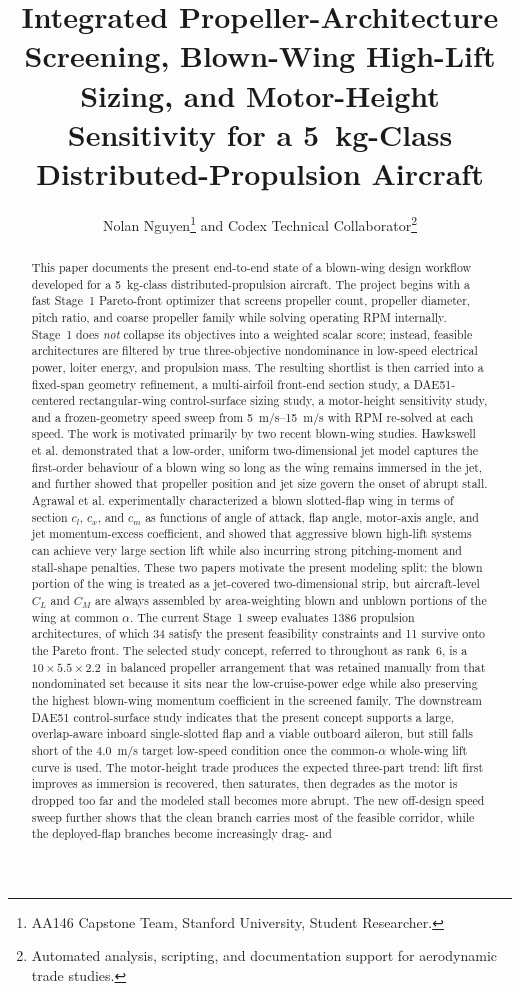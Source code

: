 \documentclass[conf]{new-aiaa}
\title{Integrated Propeller-Architecture Screening, Blown-Wing High-Lift Sizing, and Motor-Height Sensitivity for a \SI{5}{kg}-Class Distributed-Propulsion Aircraft}
\author{Nolan Nguyen\footnote{AA146 Capstone Team, Stanford University, Student Researcher.} and Codex Technical Collaborator\footnote{Automated analysis, scripting, and documentation support for aerodynamic trade studies.}}
\affil{AA146 Capstone, Stanford University, Stanford, California, 94305}
\begin{document}
\maketitle

\begin{abstract}
This paper documents the present end-to-end state of a blown-wing design workflow developed for a \SI{5}{kg}-class distributed-propulsion aircraft. The project begins with a fast Stage~1 Pareto-front optimizer that screens propeller count, propeller diameter, pitch ratio, and coarse propeller family while solving operating RPM internally. Stage~1 does \emph{not} collapse its objectives into a weighted scalar score; instead, feasible architectures are filtered by true three-objective nondominance in low-speed electrical power, loiter energy, and propulsion mass. The resulting shortlist is then carried into a fixed-span geometry refinement, a multi-airfoil front-end section study, a DAE51-centered rectangular-wing control-surface sizing study, a motor-height sensitivity study, and a frozen-geometry speed sweep from \SIrange{5}{15}{m/s} with RPM re-solved at each speed. The work is motivated primarily by two recent blown-wing studies. Hawkswell et al. demonstrated that a low-order, uniform two-dimensional jet model captures the first-order behaviour of a blown wing so long as the wing remains immersed in the jet, and further showed that propeller position and jet size govern the onset of abrupt stall.\cite{Hawkswell2022} Agrawal et al. experimentally characterized a blown slotted-flap wing in terms of section $c_l$, $c_x$, and $c_m$ as functions of angle of attack, flap angle, motor-axis angle, and jet momentum-excess coefficient, and showed that aggressive blown high-lift systems can achieve very large section lift while also incurring strong pitching-moment and stall-shape penalties.\cite{Agrawal2019} These two papers motivate the present modeling split: the blown portion of the wing is treated as a jet-covered two-dimensional strip, but aircraft-level $C_L$ and $C_M$ are always assembled by area-weighting blown and unblown portions of the wing at common $\alpha$. The current Stage~1 sweep evaluates 1386 propulsion architectures, of which 34 satisfy the present feasibility constraints and 11 survive onto the Pareto front. The selected study concept, referred to throughout as rank~6, is a $10\times 5.5\times 2.2$~in balanced propeller arrangement that was retained manually from that nondominated set because it sits near the low-cruise-power edge while also preserving the highest blown-wing momentum coefficient in the screened family. The downstream DAE51 control-surface study indicates that the present concept supports a large, overlap-aware inboard single-slotted flap and a viable outboard aileron, but still falls short of the \SI{4.0}{m/s} target low-speed condition once the common-$\alpha$ whole-wing lift curve is used. The motor-height trade produces the expected three-part trend: lift first improves as immersion is recovered, then saturates, then degrades as the motor is dropped too far and the modeled stall becomes more abrupt. The new off-design speed sweep further shows that the clean branch carries most of the feasible corridor, while the deployed-flap branches become increasingly drag- and 
\end{abstract}
\end{document}
